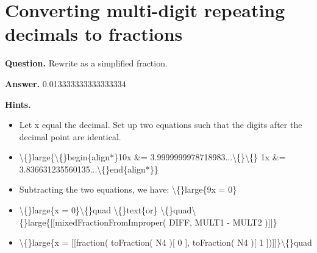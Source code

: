 \documentclass{article}
\begin{document}
\section*{Converting multi-digit repeating decimals to fractions}
\textbf{Question.} Rewrite as a simplified fraction.

\textbf{Answer.} 0.013333333333333334

\textbf{Hints.}
\begin{itemize}
  \item Let x equal the decimal. Set up two equations such that the digits after the decimal point are identical.
  \item \textbackslash\{\}large\{\textbackslash\{\}begin\{align*\}10x \&= 3.9999999978718983...\textbackslash\{\}\textbackslash\{\}
        1x \&= 3.836631235560135...\textbackslash\{\}end\{align*\}\}
  \item Subtracting the two equations, we have:
            \textbackslash\{\}large\{9x = 0\}
  \item \textbackslash\{\}large\{x = 0\}\textbackslash\{\}quad \textbackslash\{\}text\{or\} \textbackslash\{\}quad\textbackslash\{\}large\{[[mixedFractionFromImproper( DIFF, MULT1 - MULT2 )]]\}
  \item \textbackslash\{\}large\{x = [[fraction( toFraction( N4 )[ 0 ], toFraction( N4 )[ 1 ])]]\}\textbackslash\{\}quad
\end{itemize}
\end{document}
